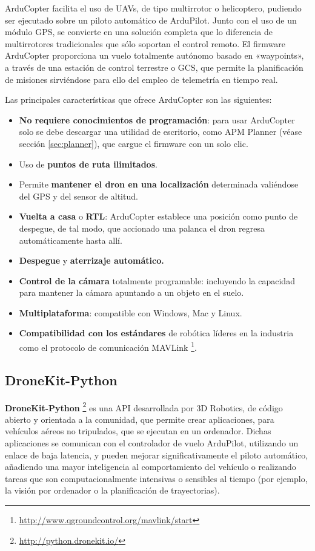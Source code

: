 ArduCopter facilita el uso de \acs{UAV}s, de tipo multirrotor o helicoptero, pudiendo ser ejecutado sobre un piloto automático de ArduPilot.
Junto con el uso de un módulo \acs{GPS}, se convierte en una solución completa que lo diferencia de multirrotores tradicionales que sólo 
soportan el control remoto. El firmware ArduCopter proporciona un vuelo totalmente autónomo basado en «waypoints», a través de 
una estación de control terrestre o \acs{GCS}, que permite la planificación de misiones sirviéndose para ello del empleo de telemetría en tiempo real.

Las principales características que ofrece ArduCopter son las siguientes:
\begin{itemize}
\item \textbf{No requiere conocimientos de programación}: para usar ArduCopter solo se debe descargar una utilidad de escritorio, como 
APM Planner (véase sección \ref{sec:planner}), que cargue el firmware con un solo clic.
\item Uso de \textbf{puntos de ruta ilimitados}.
\item Permite \textbf{mantener el dron en una localización} determinada valiéndose del \acs{GPS} y del sensor de altitud.
\item \textbf{Vuelta a casa} o \textbf{\acs{RTL}}: ArduCopter establece una posición como punto de despegue, de tal modo, que accionado una palanca el dron regresa automáticamente hasta allí.
\item \textbf{Despegue} y \textbf{aterrizaje automático.}
\item \textbf{Control de la cámara} totalmente programable: incluyendo la capacidad para mantener la cámara apuntando a un objeto en el suelo.
\item \textbf{Multiplataforma}: compatible con Windows, Mac y Linux.
\item \textbf{Compatibilidad con los estándares} de robótica líderes en la industria como el protocolo de comunicación MAVLink \footnote{\url{http://www.qgroundcontrol.org/mavlink/start}}.
\end{itemize}

\subsection{DroneKit-Python}
\label{sec:dronekit}

\textbf{DroneKit-Python} \footnote{\url{http://python.dronekit.io/}} es una \acs{API} desarrollada por 3D Robotics, de código abierto y orientada a la comunidad, que permite crear aplicaciones, para vehículos aéreos no tripulados, que se 
ejecutan en un ordenador. Dichas aplicaciones se comunican con el controlador de vuelo ArduPilot, utilizando un enlace de baja latencia, y pueden mejorar significativamente el piloto automático, añadiendo una mayor inteligencia al comportamiento del vehículo o realizando tareas que son computacionalmente intensivas o sensibles al tiempo (por ejemplo, la visión por ordenador o la planificación de trayectorias).

